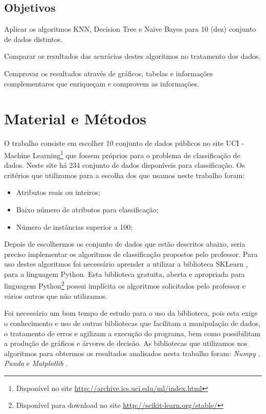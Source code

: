 \documentclass[12pt, a4paper]{article}
\begin{document}
\subsection{Objetivos}
Aplicar os algoritmos KNN, Decision Tree e Naive Bayes para 10 (dez) conjunto de dados distintos.

Comparar os resultados das acurácias destes algoritmos no tratamento dos dados.

Comprovar os resultados através de gráficos, tabelas e informações complementares que enriqueçam e comprovem as informações.


\section{Material e Métodos}
O trabalho consiste em escolher 10 conjunto de dados públicos no site UCI - Machine Learning\footnote{Disponível no site \url{http://archive.ics.uci.edu/ml/index.html}} que fossem próprios para o problema de classificação de dados. Neste site há 234 conjunto de dados disponíveis para classificação. Os critérios que utilizamos para a escolha dos que usamos neste trabalho foram:
	\begin{itemize}
    \item Atributos reais ou inteiros;
    \item Baixo número de atributos para classificação;
    \item Número de instâncias superior a 100;
    \end{itemize}
    
Depois de escolhermos os conjunto de dados que estão descritos abaixo, seria preciso implementar os algoritmos de classificação propostos pelo professor. Para uso destes algoritmos foi necessário aprender a utilizar a biblioteca SKLearn \cite{scikit-learn}, para a linguagem Python. Esta biblioteca gratuita, aberta e apropriada para linguagem Python\footnote{Disponível para download no site \url{http://scikit-learn.org/stable/}} possui implícita os algoritmos solicitados pelo professor e vários outros que não utilizamos.

Foi necessário um bom tempo de estudo para o uso da biblioteca, pois esta exige o conhecimento e uso de outras bibliotecas que facilitam a manipulação de dados, o tratamento de erros e agilizam a execução do programa, bem como possibilitam a produção de gráficos e árvores de decisão. As bibliotecas que utilizamos nos algoritmos para obtermos os resultados analisados nesta trabalho foram: \emph{Numpy} \citep{van_etal2011}, \emph{Panda} \citep{mckinney-proc-scipy-2010} e \emph{Matplotlib} \citep{hunter2007}.
\end{document}
